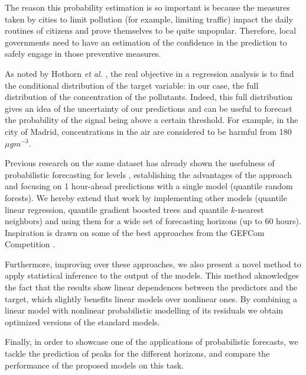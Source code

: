 \documentclass[a4paper,3p,sort&compress]{elsarticle}
\begin{document}
The reason this probability estimation is so important is because the
measures taken by cities to limit pollution (for example, limiting
traffic) impact the daily routines of citizens and prove themselves to
be quite unpopular.  Therefore, local governments need to have an
estimation of the confidence in the prediction to safely engage in
those preventive measures.


As noted by Hothorn \emph{et al.} \cite{hothorn_conditional_2014}, the
real objective in a regression analysis is to find the conditional
distribution of the target variable: in our case, the full
distribution of the concentration of the pollutants. Indeed, this full
distribution gives an idea of the uncertainty of our predictions and
can be useful to forecast the probability of the signal being above a
certain threshold. For example, in the city of Madrid, \no
concentrations in the air are considered to be harmful from 180
$\mu g m^{-3}$.

Previous research on the same dataset has already shown the usefulness
of probabilistic forecasting for \no levels \cite{proba_aznarte},
establishing the advantages of the approach and focusing on 1
hour-ahead predictions with a single model (quantile random
forests). We hereby extend that work by implementing other models
(quantile linear regression, quantile gradient boosted trees %
and quantile $k$-nearest neighbors) and using them for
a wide set of forecasting horizons (up to 60 hours). Inspiration is
drawn on some of the best approaches from the GEFCom Competition
\cite{mangalova_k-nearest_2016,hong_probabilistic_2016}.

Furthermore, improving over these approaches, we also present a novel
method to apply statistical inference to the output of the
models. This method aknowledges the fact that the results show linear
dependences between the predictors and the target, which slightly
benefits linear models over nonlinear ones. By combining a linear
model with nonlinear probabilistic modelling of its residuals we
obtain optimized versions of the standard models.

Finally, in order to showcase one of the applications of probabilistic
forecasts, we tackle the prediction of \no peaks for the different
horizons, and compare the performance of the proposed models on this
task. 
\end{document}
